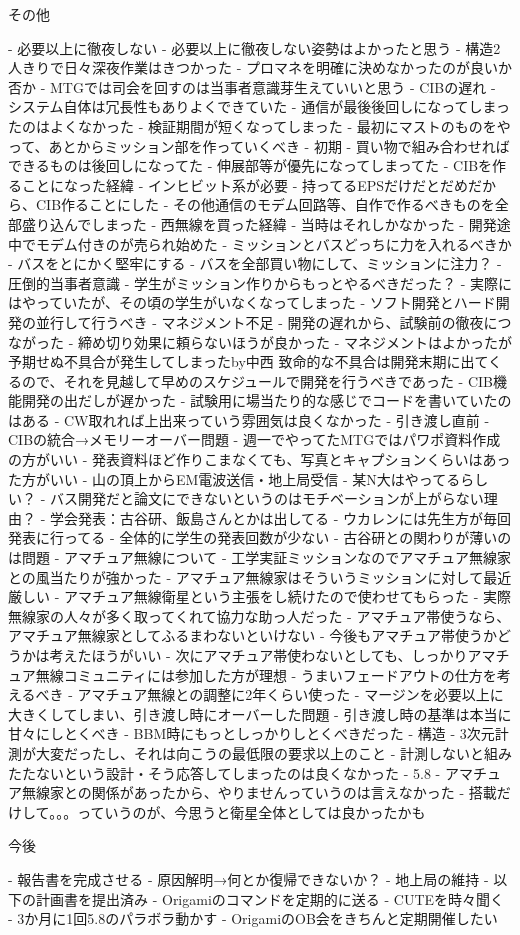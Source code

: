 その他

- 必要以上に徹夜しない
- 必要以上に徹夜しない姿勢はよかったと思う
- 構造2人きりで日々深夜作業はきつかった
- プロマネを明確に決めなかったのが良いか否か
- MTGでは司会を回すのは当事者意識芽生えていいと思う
- CIBの遅れ
- システム自体は冗長性もありよくできていた
- 通信が最後後回しになってしまったのはよくなかった
- 検証期間が短くなってしまった
- 最初にマストのものをやって、あとからミッション部を作っていくべき
- 初期
- 買い物で組み合わせればできるものは後回しになってた
- 伸展部等が優先になってしまってた
- CIBを作ることになった経緯
- インヒビット系が必要
- 持ってるEPSだけだとだめだから、CIB作ることにした
- その他通信のモデム回路等、自作で作るべきものを全部盛り込んでしまった
- 西無線を買った経緯
- 当時はそれしかなかった
- 開発途中でモデム付きのが売られ始めた
- ミッションとバスどっちに力を入れるべきか
- バスをとにかく堅牢にする
- バスを全部買い物にして、ミッションに注力？
- 圧倒的当事者意識
- 学生がミッション作りからもっとやるべきだった？
- 実際にはやっていたが、その頃の学生がいなくなってしまった
- ソフト開発とハード開発の並行して行うべき
- マネジメント不足
- 開発の遅れから、試験前の徹夜につながった
- 締め切り効果に頼らないほうが良かった
- マネジメントはよかったが予期せぬ不具合が発生してしまったby中西
致命的な不具合は開発末期に出てくるので、それを見越して早めのスケジュールで開発を行うべきであった
- CIB機能開発の出だしが遅かった
- 試験用に場当たり的な感じでコードを書いていたのはある
- CW取れれば上出来っていう雰囲気は良くなかった
- 引き渡し直前
- CIBの統合→メモリーオーバー問題
- 週一でやってたMTGではパワポ資料作成の方がいい
- 発表資料ほど作りこまなくても、写真とキャプションくらいはあった方がいい
- 山の頂上からEM電波送信・地上局受信
- 某N大はやってるらしい？
- バス開発だと論文にできないというのはモチベーションが上がらない理由？
- 学会発表：古谷研、飯島さんとかは出してる
- ウカレンには先生方が毎回発表に行ってる
- 全体的に学生の発表回数が少ない
- 古谷研との関わりが薄いのは問題
- アマチュア無線について
- 工学実証ミッションなのでアマチュア無線家との風当たりが強かった
- アマチュア無線家はそういうミッションに対して最近厳しい
- アマチュア無線衛星という主張をし続けたので使わせてもらった
- 実際無線家の人々が多く取ってくれて協力な助っ人だった
- アマチュア帯使うなら、アマチュア無線家としてふるまわないといけない
- 今後もアマチュア帯使うかどうかは考えたほうがいい
- 次にアマチュア帯使わないとしても、しっかりアマチュア無線コミュニティには参加した方が理想
- うまいフェードアウトの仕方を考えるべき
- アマチュア無線との調整に2年くらい使った
- マージンを必要以上に大きくしてしまい、引き渡し時にオーバーした問題
- 引き渡し時の基準は本当に甘々にしとくべき
- BBM時にもっとしっかりしとくべきだった
- 構造
- 3次元計測が大変だったし、それは向こうの最低限の要求以上のこと
- 計測しないと組みたたないという設計・そう応答してしまったのは良くなかった
- 5.8
- アマチュア無線家との関係があったから、やりませんっていうのは言えなかった
- 搭載だけして。。。っていうのが、今思うと衛星全体としては良かったかも

今後

- 報告書を完成させる
- 原因解明→何とか復帰できないか？
- 地上局の維持
- 以下の計画書を提出済み
- Origamiのコマンドを定期的に送る
- CUTEを時々聞く
- 3か月に1回5.8のパラボラ動かす
- OrigamiのOB会をきちんと定期開催したい
